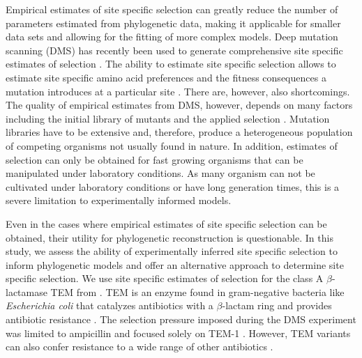 Empirical estimates of site specific selection can greatly reduce the number of parameters estimated from phylogenetic data, making it applicable for smaller data sets and allowing for the fitting of more complex models.
Deep mutation scanning (DMS) has recently been used to generate comprehensive site specific estimates of selection \citep{Fowler2014}.
The ability to estimate site specific selection allows to estimate site specific amino acid preferences and the fitness consequences a mutation introduces at a particular site \citep{bloom2014,firnberg2014,stiffler2016}.
There are, however, also shortcomings.
The quality of empirical estimates from DMS, however, depends on many factors including the initial library of mutants and the applied selection \citep{FirnbergAndOstermeier2012}.
Mutation libraries have to be extensive and, therefore, produce a heterogeneous population of competing organisms not usually found in nature.
In addition, estimates of selection can only be obtained for fast growing organisms that can be manipulated under laboratory conditions.
As many organism can not be cultivated under laboratory conditions or have long generation times, this is a severe limitation to experimentally informed models.

Even in the cases where empirical estimates of site specific selection can be obtained, their utility for phylogenetic reconstruction is questionable.
In this study, we assess the ability of experimentally inferred site specific selection to inform phylogenetic models and offer an alternative approach to determine site specific selection.
We use site specific estimates of selection for the class A $\beta$-lactamase TEM from \citet{stiffler2016}.
TEM is an enzyme found in gram-negative bacteria like \textit{Escherichia coli} that catalyzes antibiotics with a $\beta$-lactam ring and provides antibiotic resistance \citep{Neu1969}.
The selection pressure imposed during the DMS experiment was limited to ampicillin and focused solely on TEM-1 \citep{stiffler2016}.
However, TEM variants can also confer resistance to a wide range of other antibiotics \citep{sougakoff1988,sougakoff1989,goussard1991,mabilat1992,chanal1992,brun1994}.

